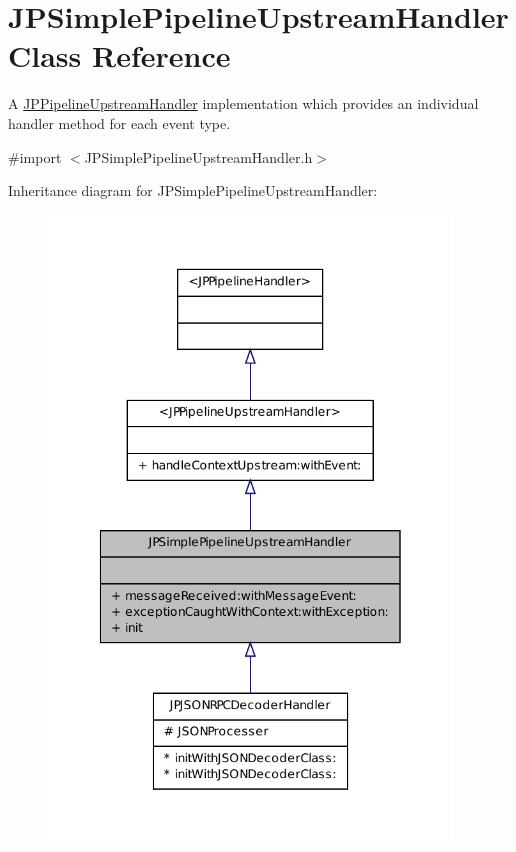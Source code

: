 \hypertarget{a00039}{
\section{JPSimplePipelineUpstreamHandler Class Reference}
\label{a00039}
}


A \hyperlink{a00035}{JPPipelineUpstreamHandler} implementation which provides an individual handler method for each event type.  




{\ttfamily \#import $<$JPSimplePipelineUpstreamHandler.h$>$}



Inheritance diagram for JPSimplePipelineUpstreamHandler:\nopagebreak
\begin{figure}[H]
\begin{center}
\leavevmode
\includegraphics[width=304pt]{a00164}
\end{center}
\end{figure}



